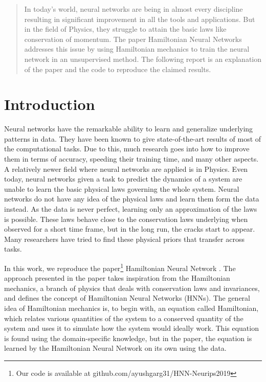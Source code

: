\begin{abstract}
In today's world, neural networks are being in almost every discipline resulting in significant improvement in all the tools and applications. But in the field of Physics, they struggle to attain the basic laws like conservation of momentum. The paper Hamiltonian Neural Networks addresses this issue by using Hamiltonian mechanics to train the neural network in an unsupervised method. The following report is an explanation of the paper and the code to reproduce the claimed results.
\end{abstract}

\section{Introduction}
Neural networks have the remarkable ability to learn and generalize underlying patterns in data. They have been known to give state-of-the-art results of most of the computational tasks. Due to this, much research goes into how to improve them in terms of accuracy, speeding their training time, and many other aspects. A relatively newer field where neural networks are applied is in Physics. Even today, neural networks given a task to predict the dynamics of a system are unable to learn the basic physical laws governing the whole system. Neural networks do not have any idea of the physical laws and learn them form the data instead. As the data is never perfect, learning only an approximation of the laws is possible. These laws behave close to the conservation laws underlying when observed for a short time frame, but in the long run, the cracks start to appear. Many researchers have tried to find these physical priors that transfer across tasks.

In this work, we reproduce the paper\footnote{Our code is available at github.com/ayushgarg31/HNN-Neurips2019} Hamiltonian Neural Network \cite{greydanus}. The approach presented in the paper takes inspiration from the Hamiltonian mechanics, a branch of physics that deals with conservation laws and invariances, and defines the concept of Hamiltonian Neural Networks (HNNs). The general idea of Hamiltonian mechanics is, to begin with, an equation called Hamiltonian, which relates various quantities of the system to a conserved quantity of the system and uses it to simulate how the system would ideally work. This equation is found using the domain-specific knowledge, but in the paper, the equation is learned by the Hamiltonian Neural Network on its own using the data.

